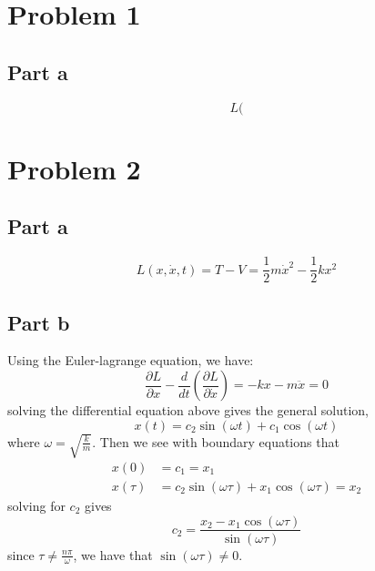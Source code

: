 \documentclass[12pt]{report}
\begin{document}
\maketitle

\section*{Problem 1}
\subsection*{Part a}
\begin{equation*}
    L(
\end{equation*}
\section*{Problem 2}
\subsection*{Part a}
\begin{equation*}
  L(x, \dot{x}, t) = T - V = \frac{1}{2}m\dot{x}^2 - \frac{1}{2}kx^2
\end{equation*}
\subsection*{Part b}
Using the Euler-lagrange equation, we have:
\begin{equation*}
  \frac{\partial L}{\partial x} - \frac{d}{dt}\left(\frac{\partial L}{\partial \dot{x}}\right) = -kx - m \ddot{x} = 0
\end{equation*}
solving the differential equation above gives the general solution,
\begin{equation*}
  x(t) = c_2 \sin\left(\omega t\right) + c_1 \cos\left(\omega t\right)
\end{equation*}
where $\omega = \sqrt{\frac{k}{m}}$. Then we see with boundary equations that
\begin{align*}
  x(0) &= c_1 = x_1 \\
  x(\tau) &= c_2 \sin\left(\omega \tau\right) + x_1 \cos\left(\omega \tau\right) = x_2
\end{align*}
solving for $c_2$ gives
\begin{equation*}
  c_2 = \frac{x_2 - x_1 \cos\left(\omega \tau\right)}{\sin\left(\omega \tau\right)}
\end{equation*}
since $\tau \neq \frac{n\pi}{\omega}$, we have that $\sin(\omega \tau) \neq 0$. 
\end{document}
